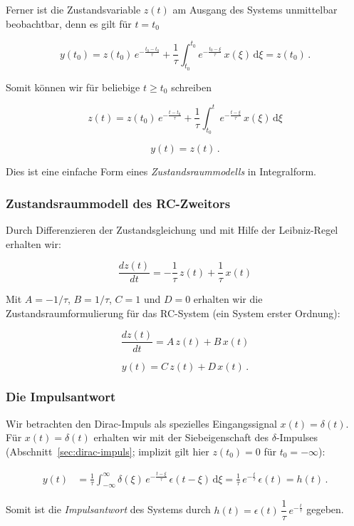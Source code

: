 \begin{beispiel}
Ferner ist die Zustandsvariable $z(t)$ am Ausgang des Systems unmittelbar beobachtbar, denn es gilt für $t = t_0$

$$
y(t_0) = z(t_0)\,e^{-\frac{t_0-t_0}{\tau}} + \frac{1}{\tau}\int_{t_0}^{t_0} e^{-\frac{t_0-\xi}{\tau}}\,x(\xi)\,\mathrm{d}\xi = z(t_0)\,.
$$

Somit können wir für beliebige $t \geq t_0$ schreiben

$$
z(t) = z(t_0)\,e^{-\frac{t-t_0}{\tau}} + \frac{1}{\tau}\int_{t_0}^{t} e^{-\frac{t-\xi}{\tau}}\,x(\xi)\,\mathrm{d}\xi
$$

$$
y(t) = z(t)\,.
$$

Dies ist eine einfache Form eines \textit{Zustandsraummodells} in Integralform.

\subsubsection*{Zustandsraummodell des RC-Zweitors}

Durch Differenzieren der Zustandsgleichung und mit Hilfe der Leibniz-Regel erhalten wir:

$$
\frac{dz(t)}{dt} = -\frac{1}{\tau}\,z(t) + \frac{1}{\tau}\,x(t)
$$

Mit $A = -1/\tau$, $B = 1/\tau$, $C = 1$ und $D = 0$ erhalten wir die Zustandsraumformulierung für das RC-System (ein System erster Ordnung):

$$
\frac{dz(t)}{dt} = A\,z(t) + B\,x(t)
$$

$$
y(t) = C\,z(t) + D\,x(t)\,.
$$

\subsubsection*{Die Impulsantwort}

Wir betrachten den Dirac-Impuls als spezielles Eingangssignal $x(t) = \delta(t)$. Für $x(t) = \delta(t)$ erhalten wir mit der Siebeigenschaft des $\delta$-Impulses (Abschnitt~\ref{sec:dirac-impuls}; implizit gilt hier $z(t_0) = 0$ für $t_0 = -\infty$):

\begin{align*}
y(t) &= \frac{1}{\tau}\int_{-\infty}^{\infty} \delta(\xi)\,e^{-\frac{t-\xi}{\tau}}\,\epsilon(t-\xi)\,\mathrm{d}\xi
      = \frac{1}{\tau}\,e^{-\frac{t}{\tau}}\,\epsilon(t) = h(t)\,.
\end{align*}

Somit ist die \textit{Impulsantwort} des Systems durch $h(t) = \epsilon(t)\,\dfrac{1}{\tau}\,e^{-\frac{t}{\tau}}$ gegeben.
\end{beispiel}

